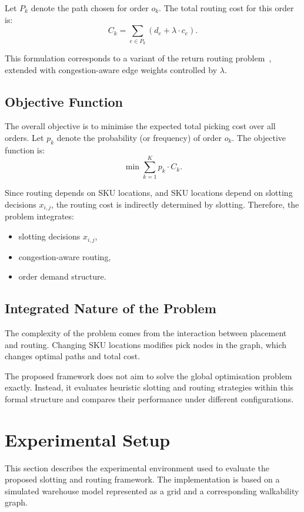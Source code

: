 \documentclass[12pt,a4paper]{article}
\begin{document}
Let $P_k$ denote the path chosen for order $o_k$. The total routing cost for this order is:
\[
  C_k = \sum_{e \in P_k} (d_e + \lambda \cdot c_e).
\]

This formulation corresponds to a variant of the return routing problem~\cite{ref_ratliff},
extended with congestion-aware edge weights controlled by $\lambda$.

\subsection{Objective Function}

The overall objective is to minimise the expected total picking cost over all orders.
Let $p_k$ denote the probability (or frequency) of order $o_k$. The objective function is:
\[
  \min \sum_{k=1}^{K} p_k \cdot C_k.
\]

Since routing depends on SKU locations, and SKU locations depend on slotting decisions
$x_{i,j}$, the routing cost is indirectly determined by slotting. Therefore, the problem
integrates:
\begin{itemize}
  \item slotting decisions $x_{i,j}$,
  \item congestion-aware routing,
  \item order demand structure.
\end{itemize}

\subsection{Integrated Nature of the Problem}

The complexity of the problem comes from the interaction between placement and routing.
Changing SKU locations modifies pick nodes in the graph, which changes optimal paths and
total cost.

The proposed framework does not aim to solve the global optimisation problem exactly.
Instead, it evaluates heuristic slotting and routing strategies within this formal structure and
compares their performance under different configurations.

\section{Experimental Setup}

This section describes the experimental environment used to evaluate the proposed slotting
and routing framework. The implementation is based on a simulated warehouse model
represented as a grid and a corresponding walkability graph.
\end{document}
